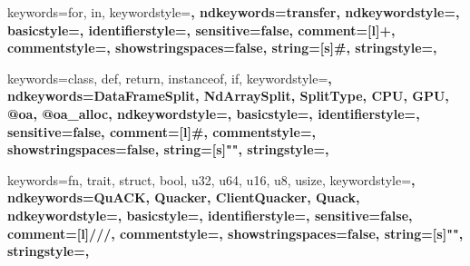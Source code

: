 \usepackage[compact]{titlesec}
\usepackage{booktabs}
\usepackage{enumitem}
\usepackage{xspace}

\usepackage{subcaption}
\usepackage{float}
\usepackage{cleveref}
\usepackage{amssymb}
\usepackage{tcolorbox}
\usepackage{stfloats}
\usepackage[section]{placeins}

\usepackage[scaled=0.85]{beramono}
\usepackage{listings}
\usepackage{hyperref}
\usepackage{xcolor}

\def\lstfloatautorefname{Listing} %

\makeatletter
\newcommand{\nospaceS}{\S\@gobble}
\makeatother
\Crefname{section}{\nospaceS}{\nospaceS}

\newcommand\code[1]{\lstinline$#1$}

 {
 keywords={for, in},
 keywordstyle=\color{BrickRed}\bfseries,
 ndkeywords={transfer},
 ndkeywordstyle=\color{NavyBlue}\bfseries,
 basicstyle=\footnotesize\ttfamily,
 identifierstyle=\color{black},
 sensitive=false,
 comment=[l]{+},
 commentstyle=\color{ForestGreen}\ttfamily\bfseries,
 showstringspaces=false,
 string=[s]{\#}{\.},
 stringstyle=\color{gray}\ttfamily,
}

 {
 keywords={class, def, return, instanceof, if},
 keywordstyle=\color{BrickRed}\bfseries,
 ndkeywords={DataFrameSplit, NdArraySplit, SplitType, CPU, GPU, @oa, @oa_alloc},
 ndkeywordstyle=\color{NavyBlue}\bfseries,
 basicstyle=\footnotesize\ttfamily,
 identifierstyle=\color{black},
 sensitive=false,
 comment=[l]{\#},
 commentstyle=\color{gray}\ttfamily\bfseries,
 showstringspaces=false,
 string=[s]{"}{"},
 stringstyle=\color{ForestGreen}\ttfamily,
}

 {
 keywords={fn, trait, struct, bool, u32, u64, u16, u8, usize},
 keywordstyle=\color{BrickRed}\bfseries,
 ndkeywords={QuACK, Quacker, ClientQuacker, Quack},
 ndkeywordstyle=\color{NavyBlue}\bfseries,
 basicstyle=\footnotesize\ttfamily,
 identifierstyle=\color{black},
 sensitive=false,
 comment=[l]{///},
 commentstyle=\color{gray}\ttfamily\bfseries,
 showstringspaces=false,
 string=[s]{"}{"},
 stringstyle=\color{ForestGreen}\ttfamily,
}

\lstset{language=Python}

\renewcommand{\topfraction}{0.95}
\renewcommand{\bottomfraction}{0.95}
\renewcommand{\textfraction}{0.05}
\renewcommand{\floatpagefraction}{0.95}


